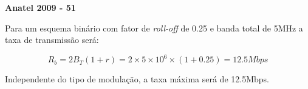 \textbf{Anatel 2009 - 51}

Para um esquema binário com fator de \textit{roll-off} de 0.25 e banda total de 5MHz a taxa de transmissão será: 

\begin{equation}
    R_b = 2B_T(1+r) = 2 \times 5 \times 10^6 \times (1+0.25) = 12.5Mbps
\end{equation}

Independente do tipo de modulação, a taxa máxima será de 12.5Mbps.